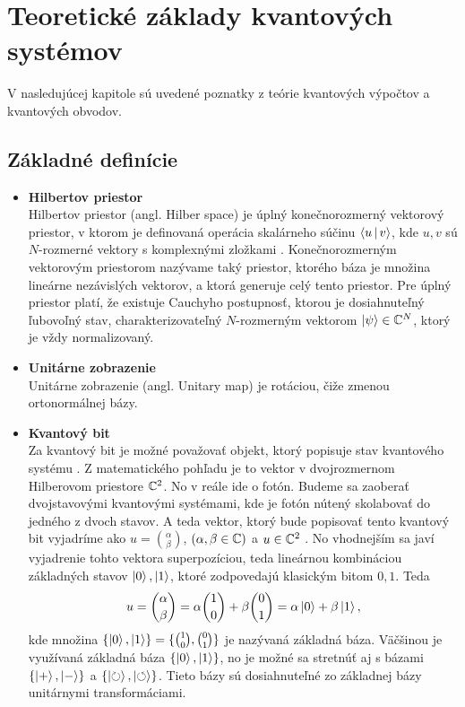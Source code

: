 
\chapter{Teoretické základy kvantových systémov}

V nasledujúcej kapitole sú uvedené poznatky z teórie kvantových výpočtov a kvantových obvodov.

\section{Základné definície}

\begin{itemize}
\item[] \textbf{Hilbertov priestor} \\
\label{hil_space}
Hilbertov priestor (angl. Hilber space) je úplný konečnorozmerný vektorový priestor, v ktorom je definovaná operácia skalárneho súčinu \(\Braket{u|v}\), kde \(u,v\) sú \(N\)-rozmerné vektory s komplexnými zložkami \cite{Nie10}.
Konečnorozmerným vektorovým priestorom nazývame taký priestor, ktorého báza je množina lineárne nezávislých  vektorov, a ktorá generuje celý tento priestor.
Pre úplný priestor platí, že existuje Cauchyho postupnosť, ktorou je dosiahnuteľný ľubovoľný stav, charakterizovateľný \(N\)-rozmerným vektorom \(\Ket{\psi} \in \mathbb{C}^{N}\), ktorý je vždy normalizovaný.

\item[] \textbf{Unitárne zobrazenie} \\
Unitárne zobrazenie (angl. Unitary map) je rotáciou, čiže zmenou ortonormálnej bázy.

\item[] \textbf{Kvantový bit} \\
Za kvantový bit je možné považovať objekt, ktorý popisuje stav kvantového systému \cite{Schu95}.
Z matematického pohľadu je to vektor v dvojrozmernom Hilberovom priestore \(\mathbb{C}^{2}\).
No v reále ide o fotón.
Budeme sa zaoberať dvojstavovými kvantovými systémami, kde je fotón nútený skolabovať do jedného z dvoch stavov.
A teda vektor, ktorý bude popisovať tento kvantový bit vyjadríme ako \(u = \binom{\alpha}{\beta}\), \( ( \alpha, \beta \in \mathbb{C} ) \) a \(u \in \mathbb{C}^{2}\) \cite{Kay07}.
No vhodnejším sa javí vyjadrenie tohto vektora superpozíciou, teda lineárnou kombináciou základných stavov \(\Ket{0}, \Ket{1}\), ktoré zodpovedajú klasickým bitom \(0,1\).
Teda \[u = \binom{\alpha}{\beta} = \alpha \binom{1}{0} + \beta \binom{0}{1} = \alpha\Ket{0} + \beta\Ket{1},\]
kde množina \(\{\Ket{0}, \Ket{1}\} = \{\binom{1}{0}, \binom{0}{1}\}\) je nazývaná základná báza.
Väčšinou je využívaná základná báza \(\{\Ket{0}, \Ket{1}\}\), no je možné sa stretnúť aj s bázami \(\{\Ket{+}, \Ket{-}\}\) a \(\{\Ket{\circlearrowright}, \Ket{\circlearrowleft}\}\). Tieto bázy sú dosiahnuteľné zo základnej bázy unitárnymi transformáciami.


\end{itemize}

